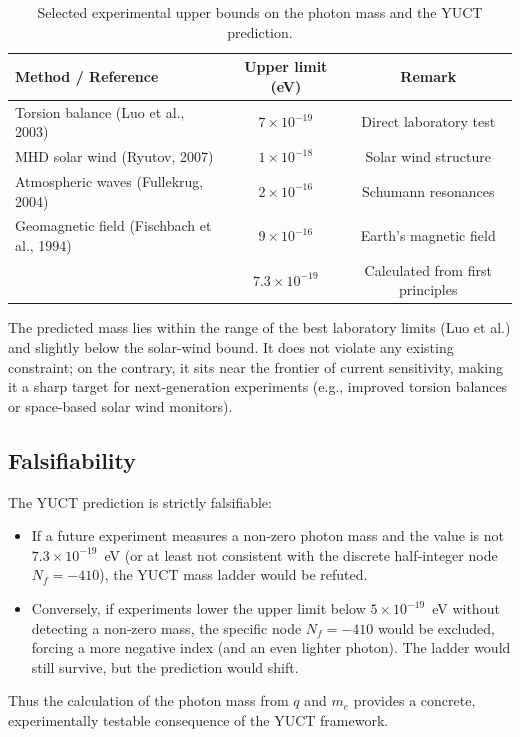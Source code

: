 \documentclass[12pt,a4paper]{article}
\begin{document}
	\begin{table}[H]
		\centering
		\caption{Selected experimental upper bounds on the photon mass and the YUCT prediction.}
		\label{tab:photon_limits}
		\begin{tabular}{lcc}
			\toprule
			\textbf{Method / Reference} & \textbf{Upper limit (eV)} & \textbf{Remark} \\
			\midrule
			Torsion balance (Luo et al., 2003) & \(7\times10^{-19}\) & Direct laboratory test \\
			MHD solar wind (Ryutov, 2007) & \(1\times10^{-18}\) & Solar wind structure \\
			Atmospheric waves (Fullekrug, 2004) & \(2\times10^{-16}\) & Schumann resonances \\
			Geomagnetic field (Fischbach et al., 1994) & \(9\times10^{-16}\) & Earth’s magnetic field \\
			\addlinespace
			\multicolumn{1}{c}{\textbf{YUCT prediction}} & \multicolumn{1}{c}{\(7.3\times10^{-19}\)} & Calculated from first principles \\
			\bottomrule
		\end{tabular}
	\end{table}
	
	The predicted mass lies within the range of the best laboratory limits (Luo et al.) and slightly below the solar-wind bound. It does not violate any existing constraint; on the contrary, it sits near the frontier of current sensitivity, making it a sharp target for next-generation experiments (e.g., improved torsion balances or space-based solar wind monitors).
	
	\subsection{Falsifiability}
	
	The YUCT prediction is strictly falsifiable:
	\begin{itemize}
		\item If a future experiment measures a non‑zero photon mass and the value is not \(7.3\times10^{-19}\)~eV (or at least not consistent with the discrete half‑integer node \(N_f = -410\)), the YUCT mass ladder would be refuted.
		\item Conversely, if experiments lower the upper limit below \(5\times10^{-19}\)~eV without detecting a non‑zero mass, the specific node \(N_f = -410\) would be excluded, forcing a more negative index (and an even lighter photon). The ladder would still survive, but the prediction would shift.
	\end{itemize}
	Thus the calculation of the photon mass from \(q\) and \(m_e\) provides a concrete, experimentally testable consequence of the YUCT framework.
	
\end{document}
